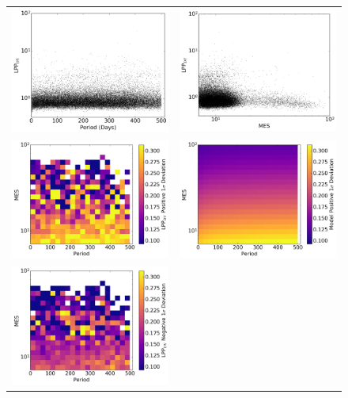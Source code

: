 \begin{figure}[hp]
\centering
\begin{tabular}{cc}
\includegraphics[width=0.5\linewidth]{ScoreFig-1.pdf} &
\includegraphics[width=0.5\linewidth]{ScoreFig-2.pdf} \\
\includegraphics[width=0.5\linewidth]{ScoreFig-3.pdf} &
\includegraphics[width=0.5\linewidth]{ScoreFig-4.pdf} \\
\includegraphics[width=0.5\linewidth]{ScoreFig-5.pdf} &

\end{tabular}
\end{figure}
